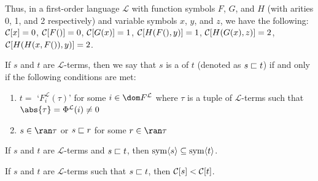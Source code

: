 \begin{eg}
    Thus, in a first-order language \( \mathcal{L} \) with function symbols \( F \), \( G \), and \( H \) (with arities 0, 1, and 2 respectively) and variable symbols
    \( x \), \( y \), and \( z \), we have the following:
    \( \folcomplexityofterm{x} = 0 \),
    \( \folcomplexityofterm{F()} = 0 \),
    \( \folcomplexityofterm{G(x)} = 1 \),
    \( \folcomplexityofterm{H(F(), y)} = 1 \),
    \( \folcomplexityofterm{H(G(x), z)} = 2 \),
    \( \folcomplexityofterm{H(H(x, F()), y)} = 2 \).
\end{eg}

\begin{dfn}[Subterms]
     \label{dfn:first-order-language-subterms}
    If \( s \) and \( t \) are \( \mathcal{L} \)-terms,
    then we say that \( s \) is a  of \( t \) (denoted as \( s  \sqsubset  t \))
    if and only if the following conditions are met:
    \begin{enumerate}[topsep=2pt,label=\textup{\texttt{(\alph*)}}]
        \item \( t = \) `\( F^{\mathcal{L}}_{i}(\tau) \)' for some \( i \in \dom F^{\mathcal{L}} \) where \( \tau \) is a tuple of \( \mathcal{L} \)-terms
            such that \( \abs{\tau} = \Phi^{\mathcal{L}}(i) \neq 0 \)
        \item \( s \in \ran \tau \) or \( s  \sqsubset  r \) for some \( r \in \ran \tau \)
    \end{enumerate}
\end{dfn}

\begin{cor}
     \label{cor:first-order-language-symbols-in-subterms-appear-in-parent-term-also}
    If \( s \) and \( t \) are \( \mathcal{L} \)-terms and \( s  \sqsubset  t \), then \( \operatorname{sym} \langle s\rangle \subseteq \operatorname{sym} \langle t\rangle \).
\end{cor}

\begin{thm}
     \label{thm:first-order-language-the-complexity-of-a-subterm-is-less-than-the-complexity-of-the-parent-term}
    If \( s \) and \( t \) are \( \mathcal{L} \)-terms such that \( s  \sqsubset  t \), then \( \folcomplexityofterm{s} < \folcomplexityofterm{t} \).
\end{thm}

